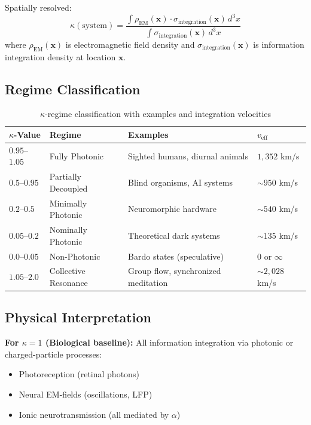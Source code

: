 \documentclass[11pt,a4paper]{article}
\begin{document}
Spatially resolved:
\begin{equation}
\kappa(\text{system}) = \frac{\int \rho_{\text{EM}}(\mathbf{x}) \cdot \sigma_{\text{integration}}(\mathbf{x}) \, d^3x}{\int \sigma_{\text{integration}}(\mathbf{x}) \, d^3x}
\label{eq:kappa_spatial}
\end{equation}
where $\rho_{\text{EM}}(\mathbf{x})$ is electromagnetic field density and $\sigma_{\text{integration}}(\mathbf{x})$ is information integration density at location $\mathbf{x}$.

\subsection{Regime Classification}

\begin{table}[ht]
\centering
\caption{$\kappa$-regime classification with examples and integration velocities}
\label{tab:kappa_regimes}
\begin{tabular}{@{}llll@{}}
\toprule
$\kappa$-Value & Regime & Examples & $v_{\text{eff}}$ \\
\midrule
$0.95$--$1.05$ & Fully Photonic & Sighted humans, diurnal animals & $1{,}352$ km/s \\
$0.5$--$0.95$ & Partially Decoupled & Blind organisms, AI systems & $\sim 950$ km/s \\
$0.2$--$0.5$ & Minimally Photonic & Neuromorphic hardware & $\sim 540$ km/s \\
$0.05$--$0.2$ & Nominally Photonic & Theoretical dark systems & $\sim 135$ km/s \\
$0.0$--$0.05$ & Non-Photonic & Bardo states (speculative) & $0$ or $\infty$ \\
$1.05$--$2.0$ & Collective Resonance & Group flow, synchronized meditation & $\sim 2{,}028$ km/s \\
\bottomrule
\end{tabular}
\end{table}

\subsection{Physical Interpretation}

\textbf{For $\kappa = 1$ (Biological baseline):}
All information integration via photonic or charged-particle processes:
\begin{itemize}
  \item Photoreception (retinal photons)
  \item Neural EM-fields (oscillations, LFP)
  \item Ionic neurotransmission (all mediated by $\alpha$)
\end{itemize}
\end{document}
